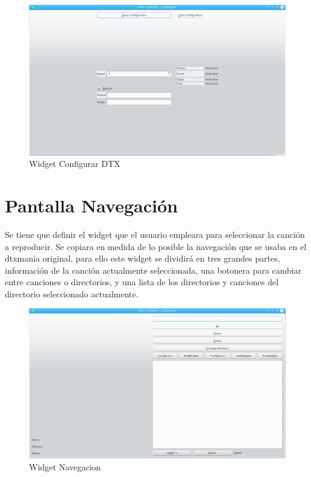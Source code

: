 \documentclass[a4paper,11pt,oneside]{book}
\begin{document}
\begin{figure}[H]
\begin{center}
\includegraphics[scale=0.4]{Imagenes/WidgetConfigurarDTX.png}
\caption{Widget Configurar DTX}
\label{Widget Configurar DTX}
\end{center}
\end{figure}
 
\section{Pantalla Navegación}
Se tiene que definir el  widget que el usuario empleara para seleccionar la canción a reproducir. Se copiara en medida de lo posible la navegación que se usaba en el dtxmania original, para ello este widget se dividirá en tres grandes partes, información de la canción actualmente seleccionada, una botonera para cambiar entre canciones o directorios, y una lista de los directorios y canciones del directorio seleccionado actualmente.

\begin{figure}[H]
\begin{center}
\includegraphics[scale=0.4]{Imagenes/WidgetNavegacion.png}
\caption{Widget Navegacion}
\label{Widget Navegacion}
\end{center}
\end{figure}
\end{document}
